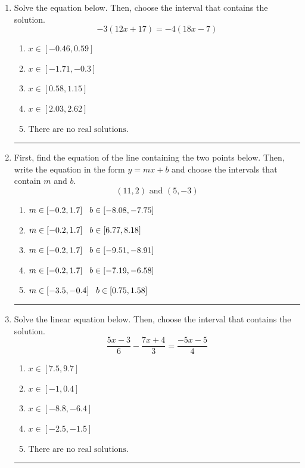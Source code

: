 \documentclass[14pt]{extbook}
\newcommand{\litem}[1]{\item#1\hspace*{-1cm}\rule{\textwidth}{0.4pt}}
\begin{document}
\begin{enumerate}
{\begin{enumerate}[label=\Alph*.]
\end{enumerate} }
\litem{
Solve the equation below. Then, choose the interval that contains the solution.\[ -3(12x + 17) = -4(18x -7) \]\begin{enumerate}[label=\Alph*.]
\item \( x \in [-0.46, 0.59] \)
\item \( x \in [-1.71, -0.3] \)
\item \( x \in [0.58, 1.15] \)
\item \( x \in [2.03, 2.62] \)
\item \( \text{There are no real solutions.} \)

\end{enumerate} }
\litem{
First, find the equation of the line containing the two points below. Then, write the equation in the form $ y=mx+b $ and choose the intervals that contain $m$ and $b$.\[ (11, 2) \text{ and } (5, -3) \]\begin{enumerate}[label=\Alph*.]
\item \( m \in [-0.2, 1.7] \hspace*{3mm} b \in [-8.08, -7.75] \)
\item \( m \in [-0.2, 1.7] \hspace*{3mm} b \in [6.77, 8.18] \)
\item \( m \in [-0.2, 1.7] \hspace*{3mm} b \in [-9.51, -8.91] \)
\item \( m \in [-0.2, 1.7] \hspace*{3mm} b \in [-7.19, -6.58] \)
\item \( m \in [-3.5, -0.4] \hspace*{3mm} b \in [0.75, 1.58] \)

\end{enumerate} }
\litem{
Solve the linear equation below. Then, choose the interval that contains the solution.\[ \frac{5x -3}{6} - \frac{7x + 4}{3} = \frac{-5x -5}{4} \]\begin{enumerate}[label=\Alph*.]
\item \( x \in [7.5, 9.7] \)
\item \( x \in [-1, 0.4] \)
\item \( x \in [-8.8, -6.4] \)
\item \( x \in [-2.5, -1.5] \)
\item \( \text{There are no real solutions.} \)


\end{enumerate}}
\end{enumerate}
\end{document}

